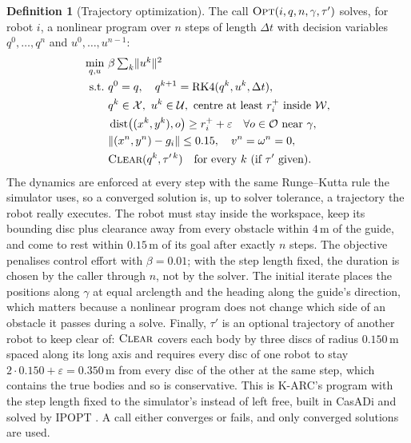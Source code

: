 \documentclass[conference]{IEEEtran}
\theoremstyle{plain}
\theoremstyle{definition}
\newtheorem{definition}{Definition}
\newcommand{\W}{\mathcal{W}}
\newcommand{\Obs}{\mathcal{O}}
\newcommand{\X}{\mathcal{X}}
\newcommand{\Uc}{\mathcal{U}}
\newcommand{\clr}{\varepsilon}
\begin{document}
\begin{definition}[Trajectory optimization]
\label{def:opt}
The call $\textsc{Opt}(i, q, n, \gamma, \tau')$ solves, for robot $i$, a nonlinear program
over $n$ steps of length $\Delta t$ with decision variables $q^0,\dots,q^n$ and
$u^0,\dots,u^{n-1}$:
\begin{equation}
\begin{aligned}
  \min_{q,u}\ & \textstyle \beta \sum_{k} \lVert u^k \rVert^2 \\
  \text{s.t.}\ & q^0 = q, \quad q^{k+1} = \mathrm{RK4}(q^k, u^k, \Delta t), \\
  & q^k \in \X,\ u^k \in \Uc,\ \text{centre at least } r^{+}_i \text{ inside } \W, \\
  & \operatorname{dist}\!\big((x^k,y^k), o\big) \ge r^{+}_i + \clr \quad
    \forall o \in \Obs \text{ near } \gamma, \\
  & \lVert (x^n,y^n) - g_i \rVert \le 0.15, \quad v^n = \omega^n = 0, \\
  & \textsc{Clear}(q^k, \tau'^{\,k}) \quad \text{for every } k \text{ (if } \tau' \text{ given)}.
\end{aligned}
\label{eq:opt}
\end{equation}
The dynamics are enforced at every step with the same Runge--Kutta rule the simulator uses,
so a converged solution is, up to solver tolerance, a trajectory the robot really executes.
The robot must stay inside the workspace, keep its bounding disc plus clearance away from
every obstacle within $4$\,m of the guide, and come to rest within $0.15$\,m of its goal after
exactly $n$ steps. The objective penalises control effort with $\beta = 0.01$; with the step
length fixed, the duration is chosen by the caller through $n$, not by the solver. The initial
iterate places the positions along $\gamma$ at equal arclength and the heading along the
guide's direction, which matters because a nonlinear program does not change which side of an
obstacle it passes during a solve. Finally, $\tau'$ is an optional trajectory of another robot
to keep clear of: $\textsc{Clear}$ covers each body by three discs of radius $0.150$\,m spaced
along its long axis and requires every disc of one robot to stay $2 \cdot 0.150 + \clr =
0.350$\,m from every disc of the other at the same step, which contains the true bodies and
so is conservative. This is K-ARC's program \cite{karc2025} with the step length fixed to the
simulator's instead of left free, built in CasADi
\cite{casadi2019} and solved by IPOPT \cite{ipopt2006}. A call either converges or fails, and
only converged solutions are used.
\end{definition}
\end{document}
